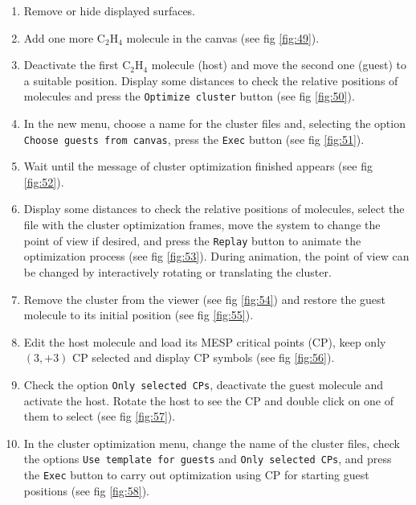 \documentclass[a4paper,10pt]{article}
\begin{document}
\begin{enumerate}

\item Remove or hide displayed surfaces. 

\item Add one more C$_2$H$_4$ molecule in the canvas (see fig \ref{fig:49}).

\item Deactivate the first C$_2$H$_4$ molecule (host) and move the second one (guest) to a 
suitable position. Display some distances to check the relative positions of molecules
and press the \texttt{Optimize cluster} button
(see fig \ref{fig:50}).

\item In the new menu, choose a name for the cluster files and, selecting the option
\texttt{Choose guests from canvas}, press the \texttt{Exec} button (see fig \ref{fig:51}).

\item Wait until the message of cluster optimization finished appears (see fig \ref{fig:52}).

\item Display some distances to check the relative positions of molecules, select the file with
the cluster optimization frames, move the system to change the point of view if desired,
and press the \texttt{Replay} button to animate the optimization process (see fig \ref{fig:53}). 
During animation, the point of view can be changed by interactively rotating or translating the cluster.

\item Remove the cluster from the viewer (see fig \ref{fig:54}) 
and restore the guest molecule to its initial position (see fig \ref{fig:55}).

\item Edit the host molecule and load its MESP critical points (CP), 
keep only $(3,+3)$ CP selected and display CP symbols
(see fig \ref{fig:56}).

\item Check the option \texttt{Only selected CPs}, deactivate the 
guest molecule and activate the host. Rotate the host to see 
the CP and double click on one of them to select (see fig \ref{fig:57}).

\item In the cluster optimization menu, change the name of the cluster files, 
check the options \texttt{Use template for guests}
and \texttt{Only selected CPs}, and press the \texttt{Exec} button to carry out optimization using
CP for starting guest positions (see fig \ref{fig:58}).


\end{enumerate}
\end{document}
